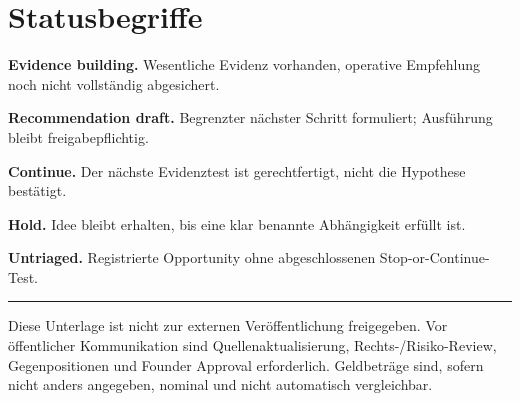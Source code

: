 \documentclass[11pt,a4paper]{article}
\begin{document}
\section{Statusbegriffe}

\textbf{Evidence building.} Wesentliche Evidenz vorhanden, operative Empfehlung noch nicht vollständig abgesichert.

\textbf{Recommendation draft.} Begrenzter nächster Schritt formuliert; Ausführung bleibt freigabepflichtig.

\textbf{Continue.} Der nächste Evidenztest ist gerechtfertigt, nicht die Hypothese bestätigt.

\textbf{Hold.} Idee bleibt erhalten, bis eine klar benannte Abhängigkeit erfüllt ist.

\textbf{Untriaged.} Registrierte Opportunity ohne abgeschlossenen Stop-or-Continue-Test.

\vfill
\hrule
\smallskip
\small
Diese Unterlage ist nicht zur externen Veröffentlichung freigegeben. Vor öffentlicher Kommunikation sind Quellenaktualisierung, Rechts-/Risiko-Review, Gegenpositionen und Founder Approval erforderlich. Geldbeträge sind, sofern nicht anders angegeben, nominal und nicht automatisch vergleichbar.
\end{document}
